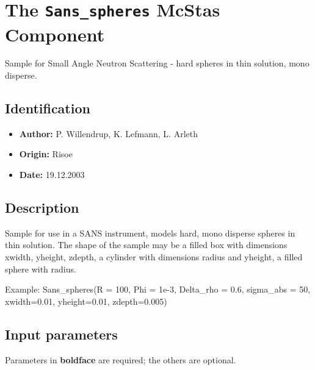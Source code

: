 \section{The \texttt{Sans\_spheres} McStas Component}
Sample for Small Angle Neutron Scattering - hard spheres in thin solution, mono disperse.

\subsection*{Identification}
\begin{itemize}
  \item \textbf{Author:} P. Willendrup, K. Lefmann, L. Arleth
  \item \textbf{Origin:} Risoe
  \item \textbf{Date:} 19.12.2003
\end{itemize}

\subsection*{Description}
Sample for use in a SANS instrument, models hard, mono disperse spheres in thin solution. The shape of the sample may be a filled box with dimensions xwidth, yheight, zdepth, a cylinder with dimensions radius and yheight, a filled sphere with radius.

Example: Sans\_spheres(R = 100, Phi = 1e-3, Delta\_rho = 0.6, sigma\_abs = 50, xwidth=0.01, yheight=0.01, zdepth=0.005)

\subsection*{Input parameters}
Parameters in \textbf{boldface} are required; the others are optional.


